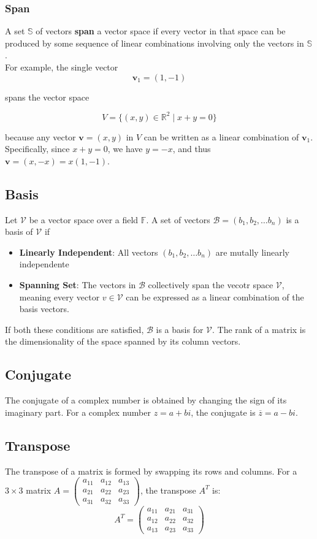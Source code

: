 \documentclass[12pt]{article}
\begin{document}
\subsubsection{Span}

A set \(\mathbb{S}\) of vectors \textbf{span} a vector space if every vector in that space can be produced by some sequence of linear combinations involving only the vectors in \(\mathbb{S}\). \\

For example, the single vector \[\mathbf{v}_1 = (1, -1)\] 

spans the vector space 

\[V = \{(x, y) \in \mathbb{R}^2 \mid x + y = 0\}\] 

because any vector \(\mathbf{v} = (x, y)\) in \(V\) can be written as a linear combination of \(\mathbf{v}_1\). Specifically, since \(x + y = 0\), we have \(y = -x\), and thus \(\mathbf{v} = (x, -x) = x(1, -1)\). \\


\subsection{Basis}
Let \(\mathcal{V}\) be a vector space over a field \(\mathbb{F}\). A set of vectors \(\mathcal{B}=(b_1, b_2, \ldots b_n)\) is a basis of \(\mathcal{V}\) if 
\begin{itemize}
\item \textbf{Linearly Independent}: All vectors \((b_1, b_2, \ldots b_n)\) are mutally linearly independente
\item \textbf{Spanning Set}: The vectors in \(\mathcal{B}\) collectively span the vecotr space \(\mathcal{V}\), meaning every vector \(v \in \mathcal{V}\) can be expressed as a linear combination of the basis vectors.
\end{itemize}
If both these conditions are satisfied, \(\mathcal{B}\) is a basis for \(\mathcal{V}\).
The rank of a matrix is the dimensionality of the space spanned by its column vectors. 
\subsection{Conjugate}
The conjugate of a complex number is obtained by changing the sign of its imaginary part.
For a complex number \( z = a + bi \), the conjugate is \(\overline{z} = a - bi\).

\subsection{Transpose}
The transpose of a matrix is formed by swapping its rows and columns.
For a \( 3 \times 3 \) matrix \( A = \begin{pmatrix} a_{11} & a_{12} & a_{13} \\ a_{21} & a_{22} & a_{23} \\ a_{31} & a_{32} & a_{33} \end{pmatrix} \), the transpose \( A^T \) is:
\[ A^T = \begin{pmatrix} a_{11} & a_{21} & a_{31} \\ a_{12} & a_{22} & a_{32} \\ a_{13} & a_{23} & a_{33} \end{pmatrix} \]
\end{document}
